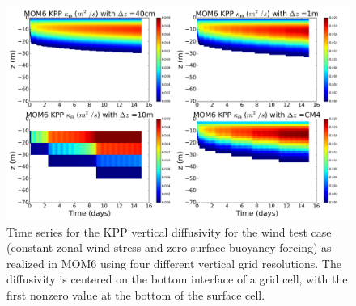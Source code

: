 \begin{figure}[h!t]
\begin{center}
\includegraphics[angle=0,width=14cm]{./figs/MOM6/wind_only_KPP_MOM6_KPP_diffusivity.png}
\caption[KPP diffusivity from MOM6 for winds-alone test]{\sf Time
  series for the KPP vertical diffusivity for the wind test case
  (constant zonal wind stress and zero surface buoyancy forcing) as
  realized in MOM6 using four different vertical grid resolutions.
  The diffusivity is centered on the bottom interface of a grid cell,
  with the first nonzero value at the bottom of the surface cell.}
\label{fig:MOM6_KPP_diffusivity-wind_alone}
\end{center}
\end{figure}


